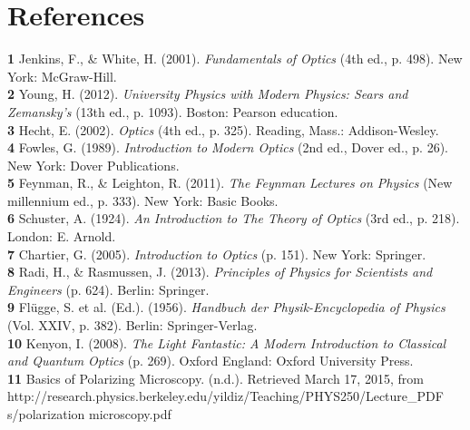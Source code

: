 \documentclass[a4paper,12pt]{report}
\begin{document}
\chapter{References}
\textbf{1}	Jenkins, F., & White, H. (2001). \textit{Fundamentals of Optics} (4th ed., p. 498). New York: McGraw-Hill.\\
\textbf{2} Young, H. (2012). \textit{University Physics with Modern Physics: Sears and Zemansky's} (13th ed., p. 1093). Boston: Pearson education.\\
\textbf{3} Hecht, E. (2002). \textit{Optics} (4th ed., p. 325). Reading, Mass.: Addison-Wesley.\\
\textbf{4} Fowles, G. (1989). \textit{Introduction to Modern Optics} (2nd ed., Dover ed., p. 26). New York: Dover Publications.\\
\textbf{5} Feynman, R., & Leighton, R. (2011). \textit{The Feynman Lectures on Physics} (New millennium ed., p. 333). New York: Basic Books.\\
\textbf{6} Schuster, A. (1924). \textit{An Introduction to The Theory of Optics} (3rd ed., p. 218). London: E. Arnold.\\
\textbf{7} Chartier, G. (2005). \textit{Introduction to Optics} (p. 151). New York: Springer.\\
\textbf{8} Radi, H., & Rasmussen, J. (2013). \textit{Principles of Physics for Scientists and Engineers} (p. 624). Berlin: Springer.\\
\textbf{9} Flügge, S. et al. (Ed.). (1956). \textit{Handbuch der Physik-Encyclopedia of Physics} (Vol. XXIV, p. 382). Berlin: Springer-Verlag.\\
\textbf{10} Kenyon, I. (2008). \textit{The Light Fantastic: A Modern Introduction to Classical and Quantum Optics} (p. 269). Oxford England: Oxford University Press.\\
\textbf{11} Basics of Polarizing Microscopy. (n.d.). Retrieved March 17, 2015, from http://research.physics.berkeley.edu/yildiz/Teaching/PHYS250/Lecture_PDF\\s/polarization microscopy.pdf
\end{document}

